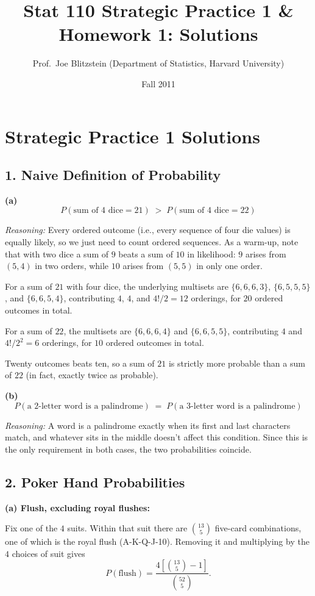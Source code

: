 \documentclass{article}
\title{Stat 110 Strategic Practice 1 \& Homework 1: Solutions}
\author{Prof.\ Joe Blitzstein (Department of Statistics, Harvard University)}
\date{Fall 2011}
\begin{document}
\maketitle

\section*{Strategic Practice 1 Solutions}

\subsection*{1. Naive Definition of Probability}

\textbf{(a)}
$$P(\text{sum of 4 dice} = 21) \; > \; P(\text{sum of 4 dice} = 22)$$

\emph{Reasoning:} Every ordered outcome (i.e., every sequence of four die values) is equally likely, so we just need to count ordered sequences. As a warm-up, note that with two dice a sum of $9$ beats a sum of $10$ in likelihood: $9$ arises from $(5,4)$ in two orders, while $10$ arises from $(5,5)$ in only one order.

For a sum of $21$ with four dice, the underlying multisets are $\{6,6,6,3\}$, $\{6,5,5,5\}$, and $\{6,6,5,4\}$, contributing $4$, $4$, and $4!/2=12$ orderings, for $20$ ordered outcomes in total.

For a sum of $22$, the multisets are $\{6,6,6,4\}$ and $\{6,6,5,5\}$, contributing $4$ and $4!/2^2=6$ orderings, for $10$ ordered outcomes in total.

Twenty outcomes beats ten, so a sum of $21$ is strictly more probable than a sum of $22$ (in fact, exactly twice as probable).

\medskip
\textbf{(b)}
$$P(\text{a 2-letter word is a palindrome}) \; = \; P(\text{a 3-letter word is a palindrome})$$

\emph{Reasoning:} A word is a palindrome exactly when its first and last characters match, and whatever sits in the middle doesn't affect this condition. Since this is the only requirement in both cases, the two probabilities coincide.

\subsection*{2. Poker Hand Probabilities}

\textbf{(a) Flush, excluding royal flushes:}

Fix one of the $4$ suits. Within that suit there are $\binom{13}{5}$ five-card combinations, one of which is the royal flush (A-K-Q-J-10). Removing it and multiplying by the $4$ choices of suit gives
$$P(\text{flush}) = \frac{4\left[\binom{13}{5} - 1\right]}{\binom{52}{5}}.$$
\end{document}
